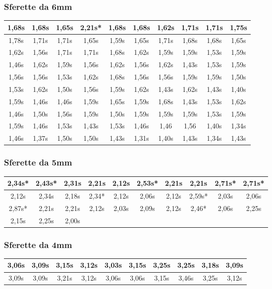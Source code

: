 \subsubsection{Sferette da 6mm}
\begin{tabular}{cccccccccc}
\toprule
 1,68s & 1,68s & 1,65s & 2,21s* & 1,68s & 1,68s & 1,62s & 1,71s & 1,71s & 1,75s \\
 \midrule
 1,78s & 1,71s & 1,71s & 1,65s & 1,59s  & 1,65s  & 1,71s  & 1,68s & 1,68s & 1,65s \\
\midrule
 1,62s & 1,56s & 1,71s & 1,71s & 1,68s & 1,62s & 1,59s & 1,59s & 1,53s & 1,59s \\
 \midrule
 1,46s & 1,62s & 1,59s & 1,56s & 1,62s & 1,56s & 1,62s & 1,43s & 1,53s & 1,59s \\
\midrule
 1,56s & 1,56s & 1,53s & 1,62s & 1,68s & 1,56s & 1,56s & 1,59s & 1,59s & 1,50s\\
 \midrule
 1,53s & 1,62s & 1,50s & 1,56s & 1,59s & 1,62s & 1,43s & 1,62s & 1,43s & 1,40s \\
\midrule
 1,59s & 1,46s & 1,46s & 1,59s & 1,65s & 1,59s & 1,68s & 1,43s & 1,53s & 1,62s \\
 \midrule
 1,46s & 1,50s & 1,56s & 1,59s & 1,50s & 1,59s  & 1,59s & 1,59s & 1,53s & 1,59s \\
\midrule
1,59s & 1,46s & 1,53s & 1,43s & 1,53s & 1,46s & 1,46 & 1,56 & 1,40s & 1,34s \\
\midrule
1,46s & 1,37s  & 1,50s   & 1,50s  & 1,43s & 1,31s & 1,40s  & 1,43s  & 1,34s & 1,43s \\
\bottomrule
\end{tabular}
\subsubsection{Sferette da 5mm}
\begin{tabular}{cccccccccc}
\toprule
 2,34s* & 2,43s* & 2,31s & 2,21s & 2,12s & 2,53s* & 2,21s & 2,21s & 2,71s* & 2,71s* \\
 \midrule
 2,12s & 2,34s & 2,18s & 2,34* & 2,12s & 2,06s & 2,12s & 2,59s* & 2,03s & 2,06s \\
\midrule
 2,87s* & 2,21s & 2,21s & 2,12s & 2,03s & 2,09s & 2,12s & 2,46* & 2,06s & 2,25s \\
 \midrule
 2,15s & 2,25s & 2,00s &  &  &  &  &  &  & \\
\bottomrule
\end{tabular}
\subsubsection{Sferette da 4mm}
\begin{tabular}{cccccccccc}
\toprule
 3,06s & 3,09s & 3,15s & 3,12s & 3,03s & 3,15s & 3,25s & 3,25s & 3,18s & 3,09s \\
 \midrule
 3,09s & 3,09s & 3,21s & 3,12s & 3,06s & 3,06s & 3,15s & 3,46s & 3,25s & 3,12s \\
\bottomrule
\end{tabular}
